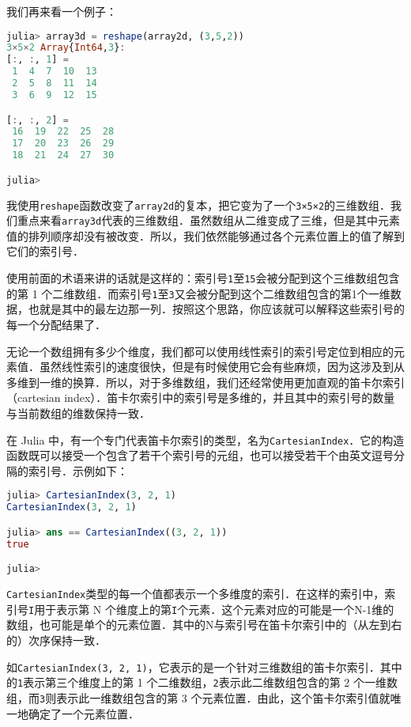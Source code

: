 我们再来看一个例子：

\begin{lstlisting}[language=julia]
julia> array3d = reshape(array2d, (3,5,2))
3×5×2 Array{Int64,3}:
[:, :, 1] =
 1  4  7  10  13
 2  5  8  11  14
 3  6  9  12  15

[:, :, 2] =
 16  19  22  25  28
 17  20  23  26  29
 18  21  24  27  30

julia> 
\end{lstlisting}

我使用\verb|reshape|函数改变了\verb|array2d|的复本，把它变为了一个\verb|3×5×2|的三维数组．我们重点来看\verb|array3d|代表的三维数组．虽然数组从二维变成了三维，但是其中元素值的排列顺序却没有被改变．所以，我们依然能够通过各个元素位置上的值了解到它们的索引号．

使用前面的术语来讲的话就是这样的：索引号\verb|1|至\verb|15|会被分配到这个三维数组包含的第 1 个二维数组．而索引号\verb|1|至\verb|3|又会被分配到这个二维数组包含的第1个一维数据，也就是其中的最左边那一列．按照这个思路，你应该就可以解释这些索引号的每一个分配结果了．

无论一个数组拥有多少个维度，我们都可以使用线性索引的索引号定位到相应的元素值．虽然线性索引的速度很快，但是有时候使用它会有些麻烦，因为这涉及到从多维到一维的换算．所以，对于多维数组，我们还经常使用更加直观的笛卡尔索引（cartesian index）．笛卡尔索引中的索引号是多维的，并且其中的索引号的数量与当前数组的维数保持一致．

在 Julia 中，有一个专门代表笛卡尔索引的类型，名为\verb|CartesianIndex|．它的构造函数既可以接受一个包含了若干个索引号的元组，也可以接受若干个由英文逗号分隔的索引号．示例如下：

\begin{lstlisting}[language=julia]
julia> CartesianIndex(3, 2, 1)
CartesianIndex(3, 2, 1)

julia> ans == CartesianIndex((3, 2, 1))
true

julia> 
\end{lstlisting}

\verb|CartesianIndex|类型的每一个值都表示一个多维度的索引．在这样的索引中，索引号\verb|I|用于表示第 N 个维度上的第\verb|I|个元素．这个元素对应的可能是一个N-1维的数组，也可能是单个的元素位置．其中的N与索引号在笛卡尔索引中的（从左到右的）次序保持一致．

如\verb|CartesianIndex(3, 2, 1)|，它表示的是一个针对三维数组的笛卡尔索引．其中的\verb|1|表示第三个维度上的第 1 个二维数组，\verb|2|表示此二维数组包含的第 2 个一维数组，而\verb|3|则表示此一维数组包含的第 3 个元素位置．由此，这个笛卡尔索引值就唯一地确定了一个元素位置．

